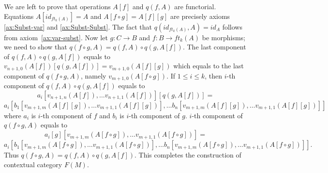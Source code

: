 \documentclass{amsart}
\theoremstyle{definition}
\theoremstyle{remark}
\numberwithin{figure}{section}
\begin{document}
We are left to prove that operations $A[f]$ and $q(f,A)$ are functorial.
Equations $A[id_{ft_k(A)}] = A$ and $A[f \circ g] = A[f][g]$ are precisely axioms \eqref{ax:Subst-var} and \eqref{ax:Subst-Subst}.
The fact that $q(id_{ft_k(A)}, A) = id_A$ follows from axiom~\ref{ax:var-subst}.
Now let $g : C \to B$ and $f : B \to ft_k(A)$ be morphisms; we need to show that $q(f \circ g, A) = q(f,A) \circ q(g,A[f])$.
The last component of $q(f,A) \circ q(g,A[f])$ equals to $v_{n+1,0}(A[f])[q(g,A[f])] = v_{m+1,0}(A[f][g])$ which equals to the last component of $q(f \circ g, A)$, namely $v_{m+1,0}(A[f \circ g])$.
If $1 \leq i \leq k$, then $i$-th component of $q(f,A) \circ q(g,A[f])$ equals to
\[ a_i[v_{n+1,n}(A[f]), \ldots v_{n+1,1}(A[f])][q(g,A[f])] = \]
\[ a_i[b_1[v_{m+1,m}(A[f][g]), \ldots v_{m+1,1}(A[f][g])], \ldots b_n[v_{m+1,m}(A[f][g]), \ldots v_{m+1,1}(A[f][g])]] \]
where $a_i$ is $i$-th component of $f$ and $b_i$ is $i$-th component of $g$.
$i$-th component of $q(f \circ g, A)$ equals to
\[ a_i[g][v_{m+1,m}(A[f \circ g]), \ldots v_{m+1,1}(A[f \circ g])] = \]
\[ a_i[b_1[v_{m+1,m}(A[f \circ g]), \ldots v_{m+1,1}(A[f \circ g])], \ldots b_n[v_{m+1,m}(A[f \circ g]), \ldots v_{m+1,1}(A[f \circ g])]]. \]
Thus $q(f \circ g, A) = q(f,A) \circ q(g,A[f])$.
This completes the construction of contextual category $F(M)$.
\end{document}
